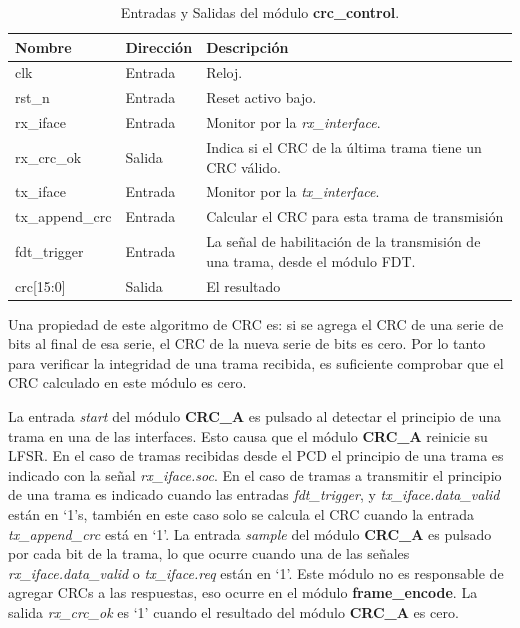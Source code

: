 \documentclass[a4paper, twoside, 11pt]{report}
\begin{document}
\begin{table}[htb]
  \centering
  \tablezebra
  \begin{tabulary}{\linewidth}{l|l|L}
    \textbf{Nombre}&\textbf{Dirección}&\textbf{Descripción} \\
    \hline
    clk&Entrada&Reloj. \\
    rst\_n&Entrada&Reset activo bajo. \\
    rx\_iface&Entrada&Monitor por la \textit{rx\_interface}. \\
    rx\_crc\_ok&Salida&Indica si el CRC de la última trama tiene un CRC válido. \\
    tx\_iface&Entrada&Monitor por la \textit{tx\_interface}. \\
    tx\_append\_crc&Entrada&Calcular el CRC para esta trama de transmisión \\
    fdt\_trigger&Entrada&La señal de habilitación de la transmisión de una trama, desde el módulo FDT. \\
    crc[15:0]&Salida&El resultado \\
  \end{tabulary}
  \caption{Entradas y Salidas del módulo \textbf{crc\_control}.}
  \label{tab:ports_crc_control}
\end{table}

Una propiedad de este algoritmo de CRC es: si se agrega el CRC de una serie de bits al final de esa serie, el CRC de la nueva serie de bits es cero. Por lo tanto para verificar la integridad de una trama recibida, es suficiente comprobar que el CRC calculado en este módulo es cero.

La entrada \textit{start} del módulo \textbf{CRC\_A} es pulsado al detectar el principio de una trama en una de las interfaces. Esto causa que el módulo \textbf{CRC\_A} reinicie su LFSR. En el caso de tramas recibidas desde el PCD el principio de una trama es indicado con la señal \textit{rx\_iface.soc}. En el caso de tramas a transmitir el principio de una trama es indicado cuando las entradas \textit{fdt\_trigger}, y \textit{tx\_iface.data\_valid} están en ‘1’s, también en este caso solo se calcula el CRC cuando la entrada \textit{tx\_append\_crc} está en ‘1’. La entrada \textit{sample} del módulo \textbf{CRC\_A} es pulsado por cada bit de la trama, lo que ocurre cuando una de las señales \textit{rx\_iface.data\_valid} o \textit{tx\_iface.req} están en ‘1’. Este módulo no es responsable de agregar CRCs a las respuestas, eso ocurre en el módulo \textbf{frame\_encode}. La salida \textit{rx\_crc\_ok} es ‘1’ cuando el resultado del módulo \textbf{CRC\_A} es cero.
\end{document}
